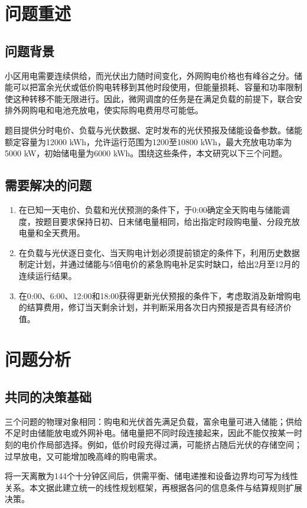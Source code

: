\section{问题重述}
\subsection{问题背景}
小区用电需要连续供给，而光伏出力随时间变化，外网购电价格也有峰谷之分。储能可以把富余光伏或低价购电转移到其他时段使用，但能量损耗、容量和功率限制使这种转移不能无限进行。因此，微网调度的任务是在满足负载的前提下，联合安排外网购电和电池充放电，使实际购电费用尽可能低。

题目提供分时电价、负载与光伏数据、定时发布的光伏预报及储能设备参数\cite{problem}。储能额定容量为12000 kWh，允许运行范围为1200至10800 kWh，最大充放电功率为5000 kW，初始储电量为6000 kWh。围绕这些条件，本文研究以下三个问题。

\subsection{需要解决的问题}
\begin{enumerate}[label=(\arabic*),leftmargin=2.2em]
\item 在已知一天电价、负载和光伏预测的条件下，于0:00确定全天购电与储能调度，按题目要求保持日初、日末储电量相同，给出指定时段购电量、分段充放电量和全天费用。
\item 在负载与光伏逐日变化、当天购电计划必须提前锁定的条件下，利用历史数据制定计划，并通过储能与5倍电价的紧急购电补足实时缺口，给出2月至12月的连续运行结果。
\item 在0:00、6:00、12:00和18:00获得更新光伏预报的条件下，考虑取消及新增购电的结算费用，修订当天剩余计划，并判断采用各次日内预报是否具有经济价值。
\end{enumerate}

\section{问题分析}
\subsection{共同的决策基础}
三个问题的物理对象相同：购电和光伏首先满足负载，富余电量可进入储能；供给不足时由储能放电或外网补电。储电量把不同时段连接起来，因此不能仅按某一时刻的电价作局部选择。例如，低价时段充得过满，可能挤占随后光伏的存储空间；过早放电，又可能增加晚高峰的购电需求。

将一天离散为144个十分钟区间后，供需平衡、储电递推和设备边界均可写为线性关系。本文据此建立统一的线性规划框架，再根据各问的信息条件与结算规则扩展决策。

